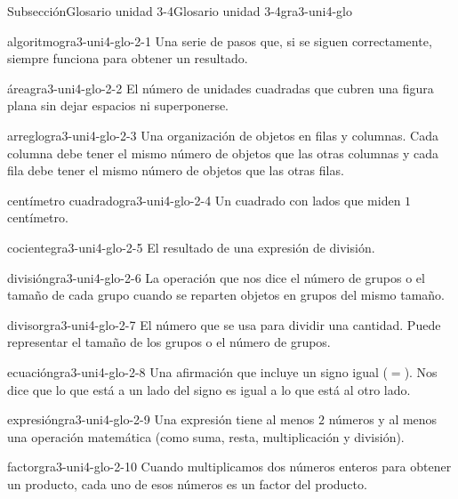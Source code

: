 \begin{subsectionptx}{Subsección}{Glosario unidad 3-4}{}{Glosario unidad 3-4}{}{}{gra3-uni4-glo}
%
\begin{descriptionlist}
\begin{dlimedium}{algoritmo}{gra3-uni4-glo-2-1}%
Una serie de pasos que, si se siguen correctamente, siempre funciona para obtener un resultado.%
\end{dlimedium}%
\begin{dlimedium}{área}{gra3-uni4-glo-2-2}%
El número de unidades cuadradas que cubren una figura plana sin dejar espacios ni superponerse.%
\end{dlimedium}%
\begin{dlimedium}{arreglo}{gra3-uni4-glo-2-3}%
Una organización de objetos en filas y columnas. Cada columna debe tener el mismo número de objetos que las otras columnas y cada fila debe tener el mismo número de objetos que las otras filas.%
\end{dlimedium}%
\begin{dlimedium}{centímetro cuadrado}{gra3-uni4-glo-2-4}%
Un cuadrado con lados que miden \(1\) centímetro.%
\end{dlimedium}%
\begin{dlimedium}{cociente}{gra3-uni4-glo-2-5}%
El resultado de una expresión de división.%
\end{dlimedium}%
\begin{dlimedium}{división}{gra3-uni4-glo-2-6}%
La operación que nos dice el número de grupos o el tamaño de cada grupo cuando se reparten objetos en grupos del mismo tamaño.%
\end{dlimedium}%
\begin{dlimedium}{divisor}{gra3-uni4-glo-2-7}%
El número que se usa para dividir una cantidad. Puede representar el tamaño de los grupos o el número de grupos.%
\end{dlimedium}%
\begin{dlimedium}{ecuación}{gra3-uni4-glo-2-8}%
Una afirmación que incluye un signo igual (\(=\)). Nos dice que lo que está a un lado del signo es igual a lo que está al otro lado.%
\end{dlimedium}%
\begin{dlimedium}{expresión}{gra3-uni4-glo-2-9}%
Una expresión tiene al menos \(2\) números y al menos una operación matemática (como suma, resta, multiplicación y división).%
\end{dlimedium}%
\begin{dlimedium}{factor}{gra3-uni4-glo-2-10}%
Cuando multiplicamos dos números enteros para obtener un producto, cada uno de esos números es un factor del producto.%

\end{dlimedium}
\end{descriptionlist}
\end{subsectionptx}
